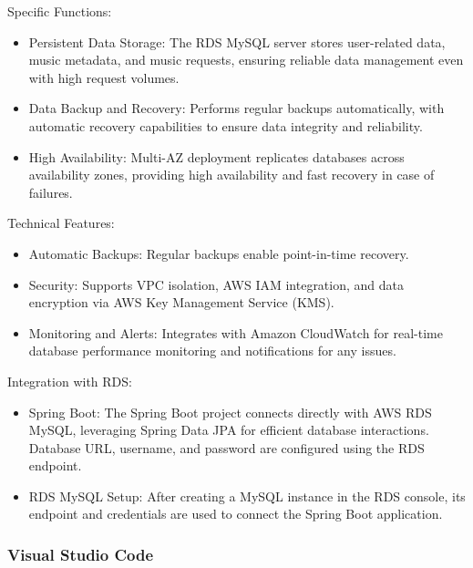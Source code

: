 \documentclass[conference]{IEEEtran}
\begin{document}
Specific Functions:
\begin{itemize}
    \item Persistent Data Storage: The RDS MySQL server stores user-related data, music metadata, and music requests, ensuring reliable data management even with high request volumes.\\
    \item Data Backup and Recovery: Performs regular backups automatically, with automatic recovery capabilities to ensure data integrity and reliability.\\
    \item High Availability: Multi-AZ deployment replicates databases across availability zones, providing high availability and fast recovery in case of failures.\\
\end{itemize}

Technical Features:
\begin{itemize}
    \item Automatic Backups: Regular backups enable point-in-time recovery.\\
    \item Security: Supports VPC isolation, AWS IAM integration, and data encryption via AWS Key Management Service (KMS).\\
    \item Monitoring and Alerts: Integrates with Amazon CloudWatch for real-time database performance monitoring and notifications for any issues.\\
\end{itemize}

Integration with RDS:
\begin{itemize}
    \item Spring Boot: The Spring Boot project connects directly with AWS RDS MySQL, leveraging Spring Data JPA for efficient database interactions. Database URL, username, and password are configured using the RDS endpoint.\\
    \item RDS MySQL Setup: After creating a MySQL instance in the RDS console, its endpoint and credentials are used to connect the Spring Boot application.\\
\end{itemize}

\subsubsection{Visual Studio Code}
\end{document}
